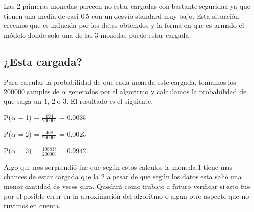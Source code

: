 Las 2 primeras monedas parecen no estar cargadas con bastante seguridad ya que tienen una media de casi 0.5 con un desvío standard muy bajo. Esta situación creemos que es inducida por los datos obtenidos y la forma en que es armado el módelo donde solo una de las 3 monedas puede estar cargada.

\subsection{¿Esta cargada?}

Para calcular la probabilidad de que cada moneda este cargada, tomamos los 200000 samples de $\alpha$ generados por el algoritmo y calculamos la probabilidad de que salga un 1, 2 o 3. El resultado es el siguiente. 


P($\alpha$ = 1) = $\frac{694}{200000}$ = 0.0035

P($\alpha$ = 2) = $\frac{468}{200000}$ = 0.0023

P($\alpha$ = 3) = $\frac{198838}{200000}$ = 0.9942

Algo que nos sorprendió fue que según estos calculos la moneda 1 tiene mas chances de estar cargada que la 2 a pesar de que según los datos esta salió una menor cantidad de veces cara. Quedará como trabajo a futuro verificar si esto fue por el posible error en la aproximación del algoritmo o algun otro aspecto que no tuvimos en cuenta.
